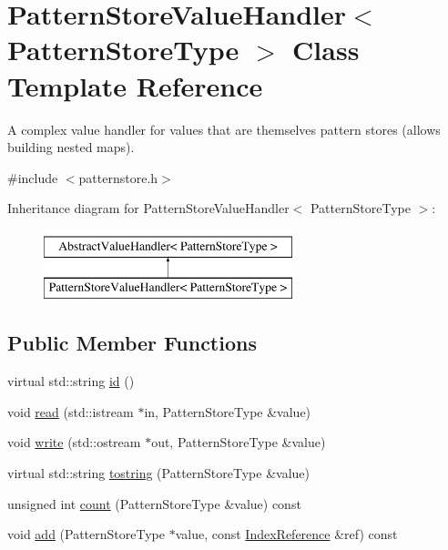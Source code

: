 \hypertarget{classPatternStoreValueHandler}{}\section{Pattern\+Store\+Value\+Handler$<$ Pattern\+Store\+Type $>$ Class Template Reference}
\label{classPatternStoreValueHandler}


A complex value handler for values that are themselves pattern stores (allows building nested maps).  




{\ttfamily \#include $<$patternstore.\+h$>$}

Inheritance diagram for Pattern\+Store\+Value\+Handler$<$ Pattern\+Store\+Type $>$\+:\begin{figure}[H]
\begin{center}
\leavevmode
\includegraphics[height=2.000000cm]{classPatternStoreValueHandler}
\end{center}
\end{figure}
\subsection*{Public Member Functions}
\begin{DoxyCompactItemize}
\item 
virtual std\+::string \hyperlink{classPatternStoreValueHandler_a8f1745d36fe84bd8b96854a30b3bc5f7}{id} ()
\item 
void \hyperlink{classPatternStoreValueHandler_a1ee31fd587f60c2c10200581724fbee6}{read} (std\+::istream $\ast$in, Pattern\+Store\+Type \&value)
\item 
void \hyperlink{classPatternStoreValueHandler_a64d152c70a8ffd4f5ffdb09abb570b2d}{write} (std\+::ostream $\ast$out, Pattern\+Store\+Type \&value)
\item 
virtual std\+::string \hyperlink{classPatternStoreValueHandler_ac976813f02dcad60eb8cb700c6ba0753}{tostring} (Pattern\+Store\+Type \&value)
\item 
unsigned int \hyperlink{classPatternStoreValueHandler_af967671eda3e9ab05c0bf05ca9d0dfae}{count} (Pattern\+Store\+Type \&value) const 
\item 
void \hyperlink{classPatternStoreValueHandler_af05f8053a126fa4a0b100a2a70258977}{add} (Pattern\+Store\+Type $\ast$value, const \hyperlink{classIndexReference}{Index\+Reference} \&ref) const 
\end{DoxyCompactItemize}
